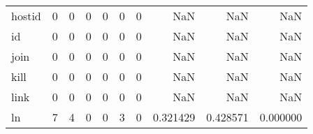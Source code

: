 \begin{tabular}{lrrrrrrrrr}
hostid    &                                                  0 &                                                  0 &                                                  0 &                                                  0 &                                                  0 &                                                  0 &                                                NaN &                                    NaN &                                  NaN \\
id        &                                                  0 &                                                  0 &                                                  0 &                                                  0 &                                                  0 &                                                  0 &                                                NaN &                                    NaN &                                  NaN \\
join      &                                                  0 &                                                  0 &                                                  0 &                                                  0 &                                                  0 &                                                  0 &                                                NaN &                                    NaN &                                  NaN \\
kill      &                                                  0 &                                                  0 &                                                  0 &                                                  0 &                                                  0 &                                                  0 &                                                NaN &                                    NaN &                                  NaN \\
link      &                                                  0 &                                                  0 &                                                  0 &                                                  0 &                                                  0 &                                                  0 &                                                NaN &                                    NaN &                                  NaN \\
ln        &                                                  7 &                                                  4 &                                                  0 &                                                  0 &                                                  3 &                                                  0 &                                           0.321429 &                               0.428571 &                             0.000000 \\

\end{tabular}
